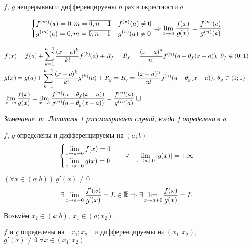 \documentclass{article}
\begin{document}

\theorem[Лопиталя 1]

$f$, $g$ непрерывны и дифференцируемы $n$ раз в окрестности $a$

\begin{align*}
	\begin{cases}
		f^{(m)}(a)=0,m=\overline{0,n-1} & f^{(n)}(a)\neq 0 \\
		g^{(m)}(a)=0,m=\overline{0,n-1} & g^{(n)}(a)\neq 0
	\end{cases}\Rightarrow \lim\limits_{x\to a}\frac{f(x)}{g(x)}=\frac{f^{(n)}(a)}{g^{(n)}(a)}
\end{align*}

\proof
\begin{align*}
	 & f(x) = f(a) + \sum_{k=1}^{n-1}\frac{(x-a)^{k}}{k!}f^{(k)}(a)+R_f=R_f=\frac{(x-a)^{n}}{n!}f^{(n)}(a+\theta_f(x-a)),\;\theta_f\in(0;1)    \\
	 & g(x) = g(a) + \sum_{k=1}^{n-1}\frac{(x-a)^{k}}{k!}g^{(k)}(a)+R_g=R_g=\frac{(x-a)^{n}}{n!}g^{(n)}(a+\theta_g(x-a)),\;\theta_g\in(0;1)    \\
	 & \lim\limits_{x\to a}\frac{f(x)}{g(x)}=\lim\limits_{x\to a}\frac{f^{(n)}(a+\theta_f(x-a))}{g^{(n)}(a+\theta_g(x-a))}=\frac{f^{(n)}(a)}{g^{(n)}(a)}\;\square.
\end{align*}

\theorem[Лопиталя 2.1]

{\it Замечание: т. Лопиталя 1 рассматривает случай, когда $f$ определена в $a$}

$f$, $g$ определены и дифференцируемы на $(a;b)$
\begin{align*}
	\begin{cases}
		\lim\limits_{x\to a+0}f(x)=0 \\
		\lim\limits_{x\to a+0}g(x)=0
	\end{cases} &  & \lor &  & \lim\limits_{x\to a+0}|g(x)|=+\infty
\end{align*}

$(\forall x\in(a;b))\;g'(x)\neq 0$
\begin{align*}
	\exists \lim\limits_{x\to a+0}\frac{f'(x)}{g'(x)}=L\in\overline{\mathbb{R}}\Rightarrow\exists\lim\limits_{x\to a+0}\frac{f(x)}{g(x)}=L
\end{align*}

\proof

Возьмём $x_2\in(a;b),\;x_1\in(a;x_2)$.

$f$ и $g$ определены на $[x_1;x_2]$ и дифференцируемы на $(x_1;x_2)$, $g'(x)\neq 0\;\forall x\in (x_1;x_2)$
\end{document}
